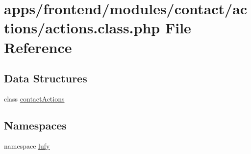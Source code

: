 \hypertarget{frontend_2modules_2contact_2actions_2actions_8class_8php}{\section{apps/frontend/modules/contact/actions/actions.class.\-php File Reference}
\label{frontend_2modules_2contact_2actions_2actions_8class_8php}
}
\subsection*{Data Structures}
\begin{DoxyCompactItemize}
\item 
class \hyperlink{classcontact_actions}{contact\-Actions}
\end{DoxyCompactItemize}
\subsection*{Namespaces}
\begin{DoxyCompactItemize}
\item 
namespace \hyperlink{namespacelufy}{lufy}
\end{DoxyCompactItemize}
